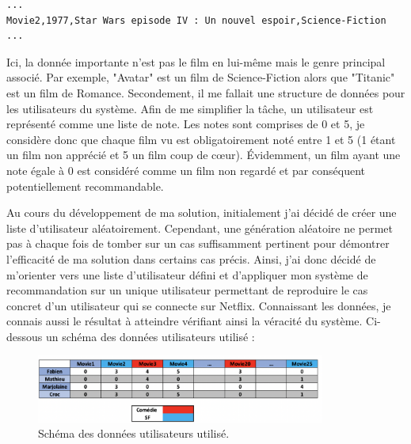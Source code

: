 \begin{verbatim}
...
Movie2,1977,Star Wars episode IV : Un nouvel espoir,Science-Fiction
...
\end{verbatim}

\vspace{5mm}

Ici, la donnée importante n’est pas le film en lui-même mais le genre principal associé. Par exemple, "Avatar" est un film de Science-Fiction alors que "Titanic" est un film de Romance. Secondement, il me fallait une structure de données pour les utilisateurs du système. Afin de me simplifier la tâche, un utilisateur est représenté comme une liste de note. Les notes sont comprises de 0 et 5, je considère donc que chaque film vu est obligatoirement noté entre 1 et 5 (1 étant un film non apprécié et 5 un film coup de cœur). Évidemment, un film ayant une note égale à 0 est considéré comme un film non regardé et par conséquent potentiellement recommandable. 

\vspace{5mm}

Au cours du développement de ma solution, initialement j'ai décidé de créer une liste d’utilisateur aléatoirement. Cependant, une génération aléatoire ne permet pas à chaque fois de tomber sur un cas suffisamment pertinent pour démontrer l’efficacité de ma solution dans certains cas précis. Ainsi, j’ai donc décidé de m’orienter vers une liste d’utilisateur défini et d’appliquer mon système de recommandation sur un unique utilisateur permettant de reproduire le cas concret d’un utilisateur qui se connecte sur Netflix. Connaissant les données, je connais aussi le résultat à atteindre vérifiant ainsi la véracité du système. Ci-dessous un schéma des données utilisateurs utilisé :  

\vspace{5mm}


\begin{figure}[htp]
  \centering
  \includegraphics[width=95mm]{./src_img/apport_data}
  \caption{Schéma des données utilisateurs utilisé.}
  \label{fig:a-un}
\end{figure}

\vspace{5mm}

